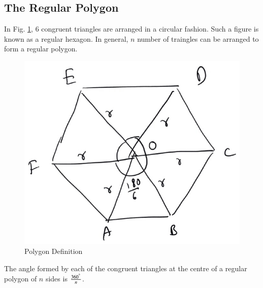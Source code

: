 \subsection{The Regular Polygon}
%

\begin{definition}
	In Fig. \ref{ch5_polygon_def}, 6 congruent triangles are arranged in a circular fashion.  Such a figure is known as a regular hexagon.  In general, $n$ number of traingles can be arranged to form a regular polygon.
\end{definition}
\begin{figure}[!h]
	\begin{center}
		
		\includegraphics[width=\columnwidth]{./figs/ch5_polygon_def}
		\vspace*{-10cm}
	\end{center}
	\caption{Polygon Definition}
	\label{ch5_polygon_def}	
\end{figure}
%
\begin{definition}
The angle formed by each of the congruent triangles at the centre of a regular polygon of $n$ sides is $\frac{360^{\degree}}{n}$.
\end{definition}
